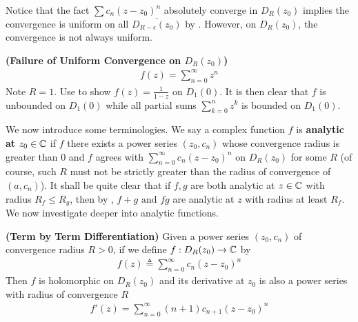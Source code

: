 \documentclass{report}
\begin{document}
\begin{mdframed}
Notice that the fact $\sum c_n(z-z_0)^n$ absolutely converge in $D_R(z_0)$ implies the convergence is uniform on all $\overline{D_{R-\epsilon }(z_0)}$ by . However, on $D_R(z_0)$, the convergence is not always uniform. 
\end{mdframed}
\begin{Example}{\textbf{(Failure of Uniform Convergence on $D_R(z_0)$)}}{}
\begin{align*}
f(z)=\sum_{n=0}^\infty z^n
\end{align*}
Note $R=1$. Use  to show $f(z)=\frac{1}{1-z}$ on $D_1(0)$. It is then clear that $f$ is unbounded on  $D_1(0)$ while all partial sums $\sum_{k=0}^n z^k$ is bounded on $D_1(0)$. 
\end{Example}
\begin{mdframed}
We now introduce some terminologies. We say a complex function $f$ is \textbf{analytic at} $z_0\in\mathbb{C}$ if $f$ there exists a power series $(z_0,c_n)$ whose convergence radius is greater than $0$ and $f$ agrees with $\sum_{n=0}^\infty c_n(z-z_0)^n$ on $D_R(z_0)$ for some $R$ (of course, such $R$ must not be strictly greater than the radius of convergence of $(a,c_n)$). It shall be quite clear that if $f,g$ are both analytic at  $z\in\mathbb{C}$ with radius $R_f\leq R_g$, then by , $f+g\text{ and }fg$ are analytic at  $z$ with radius at least $R_f$. We now investigate deeper into analytic functions.   
\end{mdframed}
\begin{theorem}
\label{AfaS}
\textbf{(Term by Term Differentiation)} Given a power series $(z_0,c_n)$ of convergence radius $R>0$, if we define $f:D_R(z_0)\rightarrow \mathbb{C}$ by
\begin{align*}
f(z)\triangleq \sum _{n=0}^{\infty}c_n(z-z_0)^n 
\end{align*}
Then $f$ is holomorphic on $D_{R}(z_0)$ and its derivative at $z_0$ is also a power series with radius of convergence $R$  
 \begin{align*}
f'(z)= \sum_{n=0}^{\infty}(n+1)c_{n+1}(z-z_0)^n
\end{align*}
\end{theorem}
\end{document}
